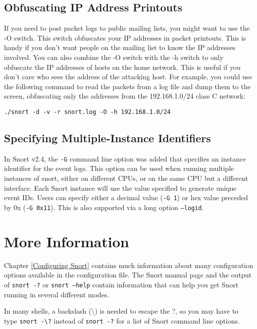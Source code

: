 \documentclass[english]{report}
\newenvironment{note}{
\samepage
    \vspace{10pt}{\textsf{
        {\hspace{7pt}\Huge{$\triangle$\hspace{-12.5pt}{\Large{$^!$}}}}\hspace{5pt}
        {\Large{NOTE}}
    }
    }
   \begin{center}
    \par\vspace{-17pt}

    \begin{lrbox}{\savepar}
    \begin{minipage}[r]{6in}
}
{
    \end{minipage}
    \end{lrbox}
    \fbox{
        \usebox{
            \savepar
	}
    }
    \par\vskip10pt
    \end{center}
}
\newenvironment{note}{
        \begin{rawhtml}
        <p><table border="1"><tr><td><b>
        Note:&nbsp;&nbsp;</b>
        \end{rawhtml}
}{
        \begin{rawhtml}
        </b></td></tr></table></p>
        \end{rawhtml}
}
\begin{document}
\subsection{Obfuscating IP Address Printouts}

If you need to post packet logs to public mailing lists, you might
want to use the -O switch. This switch obfuscates your IP addresses in
packet printouts. This is handy if you don't want people on the mailing
list to know the IP addresses involved. You can also combine the -O switch with
the -h switch to only obfuscate the IP addresses of hosts on the home network.
This is useful if you don't care who sees the address of the attacking host.
For example, you could use the following command to read the packets from a log 
file and dump them to the screen, obfuscating only the addresses from the 
192.168.1.0/24 class C network:
 
\begin{center}
\begin{verbatim}
./snort -d -v -r snort.log -O -h 192.168.1.0/24
\end{verbatim}
\end{center}

\subsection{Specifying Multiple-Instance Identifiers}

In Snort v2.4, the \texttt{-G} command line option was added that specifies
an instance identifier for the event logs.  This option can be used when
running multiple instances of snort, either on different CPUs, or on the same
CPU but a different interface.  Each Snort instance will use the value
specified to generate unique event IDs.  Users can specify either a
decimal value (\texttt{-G 1}) or hex value preceded by 0x (\texttt{-G 0x11}).
This is also supported via a long option \texttt{--logid}.

\section{More Information}

Chapter \ref{Configuring Snort} contains much information about many
configuration options available in the configuration file.  The Snort manual
page and the output of \texttt{snort -?} or \texttt{snort --help} contain
information that can help you get Snort running in several different modes.

\begin{note}
In many shells, a backslash (\textbackslash{}) is needed to escape the ?, so you may have to type 
\texttt{snort -\textbackslash{}?} instead of \texttt{snort -?} for a list of Snort command line options.
\end{note}
\end{document}
